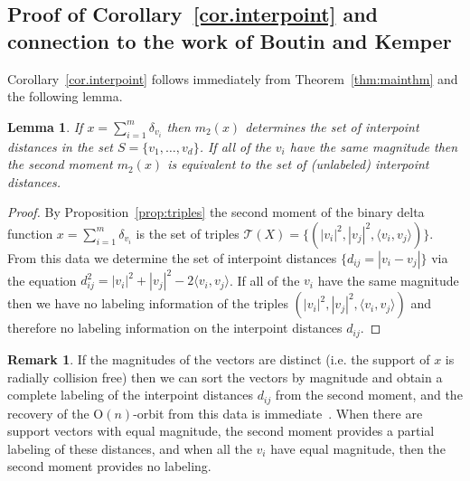 \documentclass{article}
\newtheorem{Lemma}{Lemma}
\theoremstyle{definition}
\newtheorem{Remark}{Remark}
\newcommand{\ip}[2]{\langle {#1}, {#2} \rangle}
\renewcommand{\|}{|}
\newcommand{\V}{\mathcal{V}}
\renewcommand{\O}{\mathrm{O}}
\newcommand{\arun}[1]{{\color{cyan} #1}}
\begin{document}
\subsection{Proof of Corollary~\ref{cor.interpoint} and connection to the work 
of Boutin and Kemper} \label{sec.distancegeometry}
Corollary~\ref{cor.interpoint} follows immediately from Theorem~\ref{thm:mainthm} and the following lemma.
\begin{Lemma} \label{lem.interpoint}
If $x = \sum_{i=1}^m \delta_{v_i}$ then $m_2(x)$ determines the set of interpoint distances 
in the set $S= \{v_1, \ldots , v_d\}$.
If all of the $v_i$ have the same magnitude then  the second moment $m_2(x)$ is equivalent to the set of (unlabeled) interpoint distances.
\end{Lemma}
\begin{proof}
By Proposition~\ref{prop:triples} the second moment of the binary delta function $x = \sum_{i=1}^m \delta_{v_i}$
is the set of triples $\mathcal{T}(X) = \{(\|v_i\|^2, \|v_j\|^2, \langle v_i, v_j \rangle)\}$.
From this data we
determine the set of interpoint distances  $\{d_{ij} = \|v_i - v_j\|\}$ 
via the equation $d_{ij}^2 = \|v_i\|^2 + \|v_j\|^2 - 2\ip{v_i}{v_j}$. 
If all of the $v_i$ have the same magnitude then we have no labeling information of the triples
$(\|v_i\|^2, \|v_j\|^2, \langle v_i, v_j \rangle)$ and therefore no labeling
information on the interpoint distances $d_{ij}$.
\end{proof}
\begin{Remark}
If the magnitudes of the vectors
are distinct (i.e. the support of $x$ is radially collision free) then we can sort
the vectors by magnitude and obtain a complete labeling of
the interpoint distances $d_{ij}$ from the second moment, and the recovery of the $\O(n)$-orbit from this data is immediate~\cite{bendory2024beltway}.
When there are support vectors with equal magnitude, the second moment provides a partial labeling
of these distances, and when all the $v_i$ have equal magnitude, then the second moment provides
no labeling. 
\end{Remark}
\end{document}
